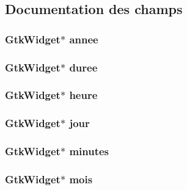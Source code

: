 \subsection{Documentation des champs}
\hypertarget{struct_data_r_d_v_a123c0853fe0470eb0a0f0af055eecc9f}{
\subsubsection[{annee}]{\setlength{\rightskip}{0pt plus 5cm}Gtk\-Widget$\ast$ annee}}\label{struct_data_r_d_v_a123c0853fe0470eb0a0f0af055eecc9f}
\hypertarget{struct_data_r_d_v_a14f0b724f1decdb5bdad19079ec1d675}{
\subsubsection[{duree}]{\setlength{\rightskip}{0pt plus 5cm}Gtk\-Widget$\ast$ duree}}\label{struct_data_r_d_v_a14f0b724f1decdb5bdad19079ec1d675}
\hypertarget{struct_data_r_d_v_a4eb5541c2c8d07380c735d1603dc7ecb}{
\subsubsection[{heure}]{\setlength{\rightskip}{0pt plus 5cm}Gtk\-Widget$\ast$ heure}}\label{struct_data_r_d_v_a4eb5541c2c8d07380c735d1603dc7ecb}
\hypertarget{struct_data_r_d_v_a366c31a9b090d9870030fe2ac52d6e46}{
\subsubsection[{jour}]{\setlength{\rightskip}{0pt plus 5cm}Gtk\-Widget$\ast$ jour}}\label{struct_data_r_d_v_a366c31a9b090d9870030fe2ac52d6e46}
\hypertarget{struct_data_r_d_v_a27524e2f658f644a11dbb3a8f9b5ab97}{
\subsubsection[{minutes}]{\setlength{\rightskip}{0pt plus 5cm}Gtk\-Widget$\ast$ minutes}}\label{struct_data_r_d_v_a27524e2f658f644a11dbb3a8f9b5ab97}
\hypertarget{struct_data_r_d_v_a430ab7341bb11cda80f096a2ec12d8d7}{
\subsubsection[{mois}]{\setlength{\rightskip}{0pt plus 5cm}Gtk\-Widget$\ast$ mois}}\label{struct_data_r_d_v_a430ab7341bb11cda80f096a2ec12d8d7}
